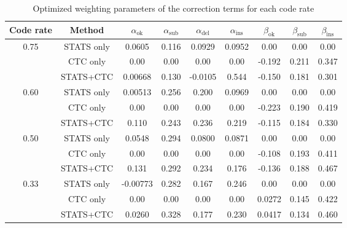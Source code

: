 \documentclass[sotsuron]{kuee}
\begin{document}
\begin{table}
  \centering
  \caption{Optimized weighting parameters of the correction terms for each code rate}
  \label{tab:appendix_params_alpha_beta}
  \footnotesize
  \begin{tabular}{c|c|cccc|ccc}
    \hline
    Code rate & Method & $\alpha_{\mathrm{ok}}$ & $\alpha_{\mathrm{sub}}$ & $\alpha_{\mathrm{del}}$ & $\alpha_{\mathrm{ins}}$ & $\beta_{\mathrm{ok}}$ & $\beta_{\mathrm{sub}}$ & $\beta_{\mathrm{ins}}$ \\
    \hline
    \multirow{3}{*}{0.75} & STATS only& 0.0605 & 0.116 & 0.0929 & 0.0952 & 0.00 & 0.00 & 0.00 \\
    & CTC only& 0.00 & 0.00 & 0.00 & 0.00 & -0.192 & 0.211 & 0.347 \\
    & STATS+CTC& 0.00668 & 0.130 & -0.0105 & 0.544 & -0.150 & 0.181 & 0.301 \\
    \hline
    \multirow{3}{*}{0.60} & STATS only & 0.00513 & 0.256 & 0.200 & 0.0969 & 0.00 & 0.00 & 0.00 \\
    & CTC only & 0.00 & 0.00 & 0.00 & 0.00 & -0.223 & 0.190 & 0.419 \\
    & STATS+CTC & 0.110 & 0.243 & 0.236 & 0.219 & -0.115 & 0.184 & 0.330 \\
    \hline
    \multirow{3}{*}{0.50} & STATS only & 0.0548 & 0.294 & 0.0800 & 0.0871 & 0.00 & 0.00 & 0.00 \\
    & CTC only & 0.00 & 0.00 & 0.00 & 0.00 & -0.108 & 0.193 & 0.411 \\
    & STATS+CTC & 0.131 & 0.292 & 0.234 & 0.176 & -0.136 & 0.188 & 0.467 \\
    \hline
    \multirow{3}{*}{0.33} & STATS only & -0.00773 & 0.282 & 0.167 & 0.246 & 0.00 & 0.00 & 0.00 \\
    & CTC only & 0.00 & 0.00 & 0.00 & 0.00 & 0.0272 & 0.145 & 0.422 \\
    & STATS+CTC & 0.0260 & 0.328 & 0.177 & 0.230 & 0.0417 & 0.134 & 0.460 \\
    \hline
  \end{tabular}
\end{table}
\end{document}
